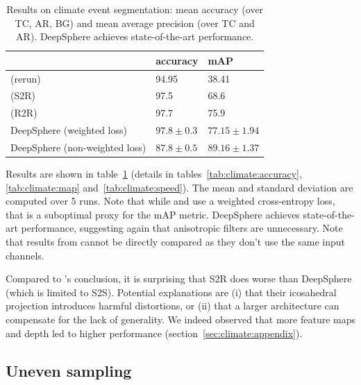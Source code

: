 \documentclass{article} %
\newcommand{\tabref}[1]{table~\ref{tab:#1}}
\newcommand{\secref}[1]{section~\ref{sec:#1}}
\begin{document}
\begin{table}
	\centering
	\begin{tabular}{l l l}
	\toprule
	& accuracy & mAP \\
	\midrule
	\citet{jiang2019sphericalcnn} (rerun) & 94.95 & 38.41 \\
	\citet{cohen2019gauge} (S2R) & 97.5 & 68.6 \\
	\citet{cohen2019gauge} (R2R) & 97.7 & 75.9 \\
	DeepSphere (weighted loss) & $97.8\pm 0.3$ & $77.15\pm 1.94$ \\
	DeepSphere (non-weighted loss) & $87.8\pm 0.5$ & $89.16\pm 1.37$ \\
	\bottomrule
	\end{tabular}
	\caption{
		Results on climate event segmentation: mean accuracy (over TC, AR, BG) and mean average precision (over TC and AR).
		DeepSphere achieves state-of-the-art performance. %
	}
	\label{tab:climate}
\end{table}

Results are shown in \tabref{climate} (details in tables~\ref{tab:climate:accuracy}, \ref{tab:climate:map} and~\ref{tab:climate:speed}).
The mean and standard deviation are computed over 5 runs.
Note that while \citet{jiang2019sphericalcnn} and \citet{cohen2019gauge} use a weighted cross-entropy loss, that is a suboptimal proxy for the mAP metric.
DeepSphere achieves state-of-the-art performance, suggesting again that anisotropic filters are unnecessary.
Note that results from \citet{mudigonda2017climateevents} cannot be directly compared as they don't use the same input channels.

Compared to \citet{cohen2019gauge}'s conclusion, it is surprising that S2R does worse than DeepSphere (which is limited to S2S).
Potential explanations are (i) that their icosahedral projection introduces harmful distortions, or (ii) that a larger architecture can compensate for the lack of generality. %
We indeed observed that more feature maps and depth led to higher performance (\secref{climate:appendix}).

\subsection{Uneven sampling} \label{sec:exp:ghcn}
\end{document}
